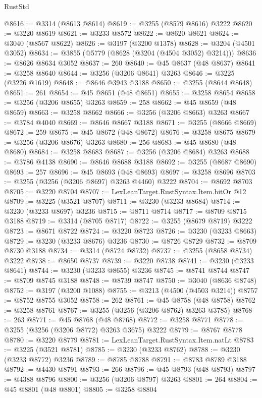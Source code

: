 \begin{lexlean}{RustStd}
\begin{coremodule}
{\begin{coremodule}
{{{{{{{{{{{{{{{{{{{{{{{{{{{{{{{{{{{{{@8616 := @3314 (@8613 @8614)
@8619 := @3255 (@8579 @8616) @3222
@8620 := @3220 @8619
@8621 := @3233 @8572
@8622 := @8620 @8621
@8624 := @3040 (@8567 @8622)
@8626 := @3197 (@3200 @1378)
@8628 := @3204 (@4501 @3052)
@8634 := @3855 (@5779 (@8628 (@3204 (@4504 @3052) @3214)))
@8636 := @8626 @8634 @3052
@8637 := 260
@8640 := @45 @8637 (@48 @8637)
@8641 := @3258 @8640
@8644 := @3256 (@3206 @8641) @3263
@8646 := @3225 (@3226 @1619)
@8648 := @8646 @3943 @3188
@8650 := @3255 (@8644 @8648)
@8651 := 261
@8654 := @45 @8651 (@48 @8651)
@8655 := @3258 @8654
@8658 := @3256 (@3206 @8655) @3263
@8659 := 258
@8662 := @45 @8659 (@48 @8659)
@8663 := @3258 @8662
@8666 := @3256 (@3206 @8663) @3263
@8667 := @3784 @4040
@8669 := @8646 @8667 @3188
@8671 := @3255 (@8666 @8669)
@8672 := 259
@8675 := @45 @8672 (@48 @8672)
@8676 := @3258 @8675
@8679 := @3256 (@3206 @8676) @3263
@8680 := 256
@8683 := @45 @8680 (@48 @8680)
@8684 := @3258 @8683
@8687 := @3256 (@3206 @8684) @3263
@8688 := @3786 @4138
@8690 := @8646 @8688 @3188
@8692 := @3255 (@8687 @8690)
@8693 := 257
@8696 := @45 @8693 (@48 @8693)
@8697 := @3258 @8696
@8703 := @3255 (@3256 (@3206 @8697) @3263 @4460) @3222
@8704 := @8692 @8703
@8705 := @3220 @8704
@8707 := LexLeanTarget.RustSyntax.Item.bitOr @12
@8709 := @3225 (@3521 @8707)
@8711 := @3230 (@3233 @8684)
@8714 := @3230 (@3233 @8697) @3236
@8715 := @8711 @8714
@8717 := @8709 @8715 @3188
@8719 := @3314 (@8705 @8717)
@8722 := @3255 (@8679 @8719) @3222
@8723 := @8671 @8722
@8724 := @3220 @8723
@8726 := @3230 (@3233 @8663)
@8729 := @3230 (@3233 @8676) @3236
@8730 := @8726 @8729
@8732 := @8709 @8730 @3188
@8734 := @3314 (@8724 @8732)
@8737 := @3255 (@8658 @8734) @3222
@8738 := @8650 @8737
@8739 := @3220 @8738
@8741 := @3230 (@3233 @8641)
@8744 := @3230 (@3233 @8655) @3236
@8745 := @8741 @8744
@8747 := @8709 @8745 @3188
@8748 := @8739 @8747
@8750 := @3040 (@8636 @8748)
@8752 := @3197 (@3200 @1088)
@8755 := @3213 (@4500 (@4503 @3214))
@8757 := @8752 @8755 @3052
@8758 := 262
@8761 := @45 @8758 (@48 @8758)
@8762 := @3258 @8761
@8767 := @3255 (@3256 (@3206 @8762) @3263 @3785)
@8768 := 263
@8771 := @45 @8768 (@48 @8768)
@8772 := @3258 @8771
@8778 := @3255 (@3256 (@3206 @8772) @3263 @3675) @3222
@8779 := @8767 @8778
@8780 := @3220 @8779
@8781 := LexLeanTarget.RustSyntax.Item.natLt
@8783 := @3225 (@3521 @8781)
@8785 := @3230 (@3233 @8762)
@8788 := @3230 (@3233 @8772) @3236
@8789 := @8785 @8788
@8791 := @8783 @8789 @3188
@8792 := @4430 @8791
@8793 := 266
@8796 := @45 @8793 (@48 @8793)
@8797 := @4388 @8796
@8800 := @3256 (@3206 @8797) @3263
@8801 := 264
@8804 := @45 @8801 (@48 @8801)
@8805 := @3258 @8804
}}}}}}}}}}}}}}}}}}}}}}}}}}}}}}}}}}}}}
\end{coremodule}}
\end{coremodule}
\end{lexlean}

